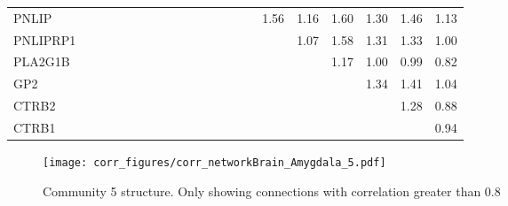 \begin{longtable}{lrrrrrrrrrrrrrrrrrrrr}
PNLIP    &              &              &              &             &             &             &            &              &            &            &            &             &           &             &           1.56 &          1.16 &      1.60 &        1.30 &        1.46 &       1.13 \\
PNLIPRP1 &              &              &              &             &             &             &            &              &            &            &            &             &           &             &                &          1.07 &      1.58 &        1.31 &        1.33 &       1.00 \\
PLA2G1B  &              &              &              &             &             &             &            &              &            &            &            &             &           &             &                &               &      1.17 &        1.00 &        0.99 &       0.82 \\
GP2      &              &              &              &             &             &             &            &              &            &            &            &             &           &             &                &               &           &        1.34 &        1.41 &       1.04 \\
CTRB2    &              &              &              &             &             &             &            &              &            &            &            &             &           &             &                &               &           &             &        1.28 &       0.88 \\
CTRB1    &              &              &              &             &             &             &            &              &            &            &            &             &           &             &                &               &           &             &             &       0.94 \\
\end{longtable}


\begin{figure}[h!]
\centering
\texttt{[image: corr\_figures/corr\_networkBrain\_Amygdala\_5.pdf]}
\caption{Community 5 structure. Only showing connections with correlation greater than 0.8}
\end{figure}




